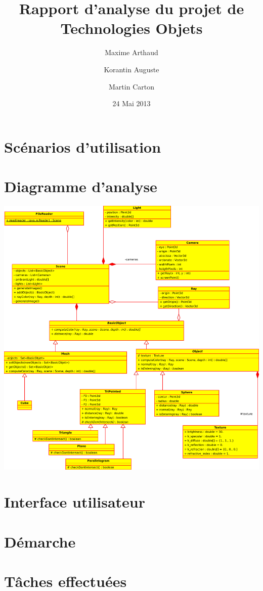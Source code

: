 \documentclass[a4paper]{article}
\title{Rapport d'analyse du projet de Technologies Objets}
\author{Maxime Arthaud \and Korantin Auguste \and Martin Carton}
\date{24 Mai 2013}
\begin{document}
\maketitle

\section{Scénarios d'utilisation}
\section{Diagramme d'analyse}
  \begin{centering}
    \centerline{\includegraphics[width=1.5\textwidth]{uml.pdf}}
  \end{centering}
\section{Interface utilisateur}
\section{Démarche}
\section{Tâches effectuées}
\end{document}
